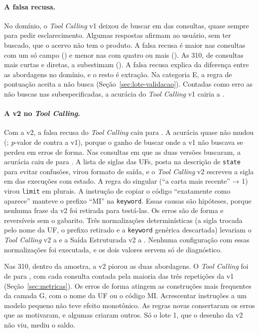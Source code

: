 \paragraph{A falsa recusa.} No domínio, o \textit{Tool Calling} v1 deixou de buscar em  das consultas, quase sempre para pedir esclarecimento. Algumas respostas afirmam ao usuário, sem ter buscado, que o acervo não tem o produto. A falsa recusa é maior nas consultas com um só campo () e menor nas com quatro ou mais (). As 310, de consultas mais curtas e diretas, a subestimam (). A falsa recusa explica  da diferença entre as abordagens no domínio, e o resto é extração. Na categoria E, a regra de pontuação aceita a não busca (Seção~\ref{sec:lote-validacao}). Contadas como erro as não buscas nas subespecificadas, a acurácia do \textit{Tool Calling} v1 cairia a .

\paragraph{A v2 no \textit{Tool Calling}.} Com a v2, a falsa recusa do \textit{Tool Calling} caiu para . A acurácia quase não mudou (; \textit{p}-valor de  contra a v1), porque o ganho de buscar onde a v1 não buscava se perdeu em erros de forma. Nas consultas em que as duas versões buscaram, a acurácia caiu de  para . A lista de siglas das UFs, posta na descrição de \texttt{state} para evitar confusões, virou formato de saída, e o \textit{Tool Calling} v2 escreveu a sigla em  das execuções com estado. A regra do singular (``a carta mais recente'' → 1) virou \texttt{limit} em plurais. A instrução de copiar o código ``exatamente como aparece'' manteve o prefixo ``MI'' na \texttt{keyword}. Essas causas são hipóteses, porque nenhuma frase da v2 foi retirada para testá-las. Os erros são de forma e reversíveis sem o gabarito. Três normalizações determinísticas (a sigla trocada pelo nome da UF, o prefixo retirado e a \texttt{keyword} genérica descartada) levariam o \textit{Tool Calling} v2 a  e a Saída Estruturada v2 a . Nenhuma configuração com essas normalizações foi executada, e os dois valores servem só de diagnóstico.

Nas 310, dentro da amostra, a v2 piorou as duas abordagens. O \textit{Tool Calling} foi de  para , com cada consulta contada pela maioria das três repetições da v1 (Seção~\ref{sec:metricas}). Os erros de forma atingem as construções mais frequentes da camada G, com o nome da UF ou o código MI. Acrescentar instruções a um modelo pequeno não teve efeito monotônico. As regras novas consertaram os erros que as motivaram, e algumas criaram outros. Só o lote 1, que o desenho da v2 não viu, mediu o saldo.

